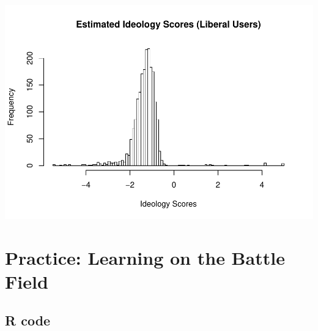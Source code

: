 \documentclass[]{book}
\begin{document}
\includegraphics{bookdown-demo_files/figure-latex/unnamed-chunk-30-3.pdf}

\hypertarget{practice-learning-on-the-battle-field}{%
\chapter{Practice: Learning on the Battle Field}\label{practice-learning-on-the-battle-field}}

\hypertarget{r-code}{%
\section{R code}\label{r-code}}
\end{document}

